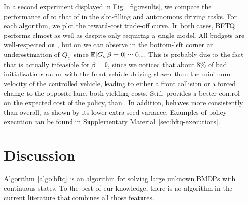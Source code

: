\documentclass{article}
\begin{document}
In a second experiment displayed in Fig.~\ref{fig:results}, we compare the performance of \FTQl to that of \BFTQ in the slot-filling and autonomous driving tasks. For each algorithm, we plot the reward-cost trade-off curve. In both cases, BFTQ performs almost as well as \FTQl despite only requiring a single model. All budgets are well-respected on , but on  we can observe in the bottom-left corner an underestimation of $Q_c$, since $\operatorname*{\mathbb{E}}[G_c|\beta=0] \simeq 0.1 $. %
This is probably due to the fact that  is actually infeasible for $\beta=0$, since we noticed that about $8\%$ of bad initialisations occur with the front vehicle driving slower than the minimum velocity of the controlled vehicle, leading to either a front collision or a forced change to the opposite lane, both yielding costs. Still, \BFTQ provides a better control on the expected cost of the policy, than \FTQl. In addition, \BFTQ behaves more consistently than \FTQl overall, as shown by its lower extra-seed variance. Examples of policy execution can be found in Supplementary Material~\ref{sec:bftq-executions}.

\section{Discussion}

Algorithm~\ref{algo:bftq} is an algorithm for solving large unknown BMDPs with continuous states. To the best of our knowledge, there is no algorithm in the current literature that combines all those features.

\end{document}
